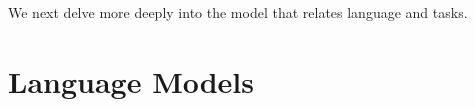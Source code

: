 \documentclass[conference]{IEEEtran}
\begin{document}





We next delve more deeply into the model that relates language and tasks.

\section{Language Models} 
\label{section:lm}
\end{document}

